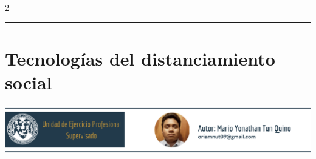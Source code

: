 \documentclass[12pt,spanish,Letterpaper,openany]{book}
\newcommand{\HRule}{\begin{center}\rule{0.5\linewidth}{0.2mm}\end{center}}
\begin{document}
\begin {multicols}{2}
\end {multicols}
\medskip
\HRule
\medskip

\hypertarget{tun}{%
\chapter{Tecnologías del distanciamiento social}\label{tun}}

\begin{center}\includegraphics[width=1\linewidth]{images/mTun_image1} \end{center}
\end{document}
